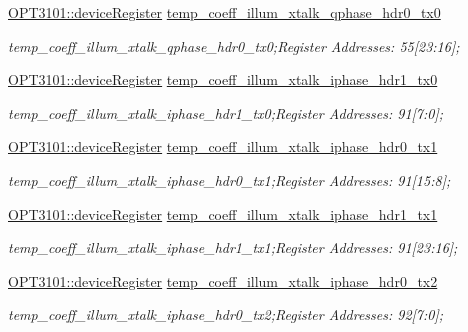 \begin{DoxyCompactItemize}
\mbox{\hyperlink{class_o_p_t3101_1_1device_register}{O\+P\+T3101\+::device\+Register}} \mbox{\hyperlink{class_o_p_t3101_1_1registers_a3077f7cdab46f4b2474567d610139551}{temp\+\_\+coeff\+\_\+illum\+\_\+xtalk\+\_\+qphase\+\_\+hdr0\+\_\+tx0}}
\begin{DoxyCompactList}\small\item\em temp\+\_\+coeff\+\_\+illum\+\_\+xtalk\+\_\+qphase\+\_\+hdr0\+\_\+tx0;Register Addresses\+: 55\mbox{[}23\+:16\mbox{]}; \end{DoxyCompactList}\item 
\mbox{\hyperlink{class_o_p_t3101_1_1device_register}{O\+P\+T3101\+::device\+Register}} \mbox{\hyperlink{class_o_p_t3101_1_1registers_ab0a97abdf69f3ae0a0b5720cb62f541f}{temp\+\_\+coeff\+\_\+illum\+\_\+xtalk\+\_\+iphase\+\_\+hdr1\+\_\+tx0}}
\begin{DoxyCompactList}\small\item\em temp\+\_\+coeff\+\_\+illum\+\_\+xtalk\+\_\+iphase\+\_\+hdr1\+\_\+tx0;Register Addresses\+: 91\mbox{[}7\+:0\mbox{]}; \end{DoxyCompactList}\item 
\mbox{\hyperlink{class_o_p_t3101_1_1device_register}{O\+P\+T3101\+::device\+Register}} \mbox{\hyperlink{class_o_p_t3101_1_1registers_ad570d0656637d6f3284a3de33d4a6f33}{temp\+\_\+coeff\+\_\+illum\+\_\+xtalk\+\_\+iphase\+\_\+hdr0\+\_\+tx1}}
\begin{DoxyCompactList}\small\item\em temp\+\_\+coeff\+\_\+illum\+\_\+xtalk\+\_\+iphase\+\_\+hdr0\+\_\+tx1;Register Addresses\+: 91\mbox{[}15\+:8\mbox{]}; \end{DoxyCompactList}\item 
\mbox{\hyperlink{class_o_p_t3101_1_1device_register}{O\+P\+T3101\+::device\+Register}} \mbox{\hyperlink{class_o_p_t3101_1_1registers_a67341013712bd314b9a3366a0e44eb90}{temp\+\_\+coeff\+\_\+illum\+\_\+xtalk\+\_\+iphase\+\_\+hdr1\+\_\+tx1}}
\begin{DoxyCompactList}\small\item\em temp\+\_\+coeff\+\_\+illum\+\_\+xtalk\+\_\+iphase\+\_\+hdr1\+\_\+tx1;Register Addresses\+: 91\mbox{[}23\+:16\mbox{]}; \end{DoxyCompactList}\item 
\mbox{\hyperlink{class_o_p_t3101_1_1device_register}{O\+P\+T3101\+::device\+Register}} \mbox{\hyperlink{class_o_p_t3101_1_1registers_a462c6bb266cdb9cc36554177f6151c3f}{temp\+\_\+coeff\+\_\+illum\+\_\+xtalk\+\_\+iphase\+\_\+hdr0\+\_\+tx2}}
\begin{DoxyCompactList}\small\item\em temp\+\_\+coeff\+\_\+illum\+\_\+xtalk\+\_\+iphase\+\_\+hdr0\+\_\+tx2;Register Addresses\+: 92\mbox{[}7\+:0\mbox{]}; \end{DoxyCompactList}\item 

\end{DoxyCompactItemize}
